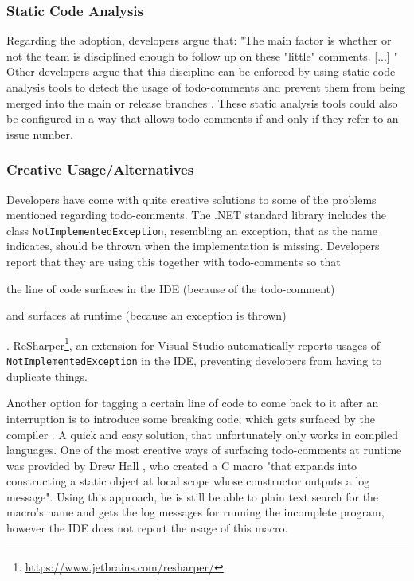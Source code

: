 \subsubsection{Static Code Analysis}
Regarding the adoption, developers argue that: "The main factor is whether or not the team is disciplined enough to follow up on these "little" comments. [...] \cite{karacic_todo_2015}"
Other developers argue that this discipline can be enforced by using static code analysis tools to detect the usage of todo-comments and prevent them from being merged into the main or release branches \cite{alecxe_how_2018}.
These static analysis tools could also be configured in a way that allows todo-comments if and only if they refer to an issue number.

\subsubsection{Creative Usage/Alternatives}
Developers have come with quite creative solutions to some of the problems mentioned regarding todo-comments.
The .NET standard library includes the class \texttt{NotImplementedException}, resembling an exception, that as the name indicates, should be thrown when the implementation is missing.
Developers report that they are using this together with todo-comments \cite{squires_use_2012} so that
\begin{enumerate*}[label=(\roman*)]
\item the line of code surfaces in the IDE (because of the todo-comment)
\item and surfaces at runtime (because an exception is thrown)
\end{enumerate*}.
ReSharper\footnote{\url{https://www.jetbrains.com/resharper/}}, an extension for Visual Studio automatically reports usages of \texttt{NotImplementedException} in the IDE, preventing developers from having to duplicate things.

Another option for tagging a certain line of code to come back to it after an interruption is to introduce some breaking code, which gets surfaced by the compiler \cite{tackabury_how_2019}.
A quick and easy solution, that unfortunately only works in compiled languages.
One of the most creative ways of surfacing todo-comments at runtime was provided by Drew Hall \cite{tackabury_how_2019}, who created a C\+\+ macro "that expands into constructing a static object at local scope whose constructor outputs a log message".
Using this approach, he is still be able to plain text search for the macro's name and gets the log messages for running the incomplete program, however the IDE does not report the usage of this macro.



